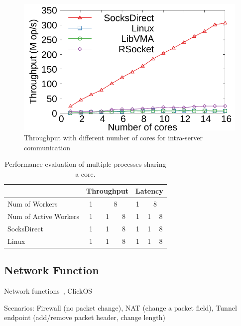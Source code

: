 \begin{figure}[htpb]
	\centering
	\includegraphics[width=\columnwidth]{eval/microbenchmark/corenum-IPC-tput.pdf}
	\caption{Throughput with different number of cores for intra-server communication}
	\label{fig:eval-cornum-ipc}
\end{figure}

\begin{table}[t]
	\centering
		\begin{tabular}{l|c|c|c|c|c|c|}
			\hline
				& \multicolumn{3}{c|}{Throughput} & \multicolumn{3}{c|}{Latency} \\
			\hline
			Num of Workers	& \multicolumn{1}{c|}{1} & \multicolumn{2}{c|}{8} & \multicolumn{1}{c|}{1} & \multicolumn{2}{c|}{8} \\
			\hline
			Num of Active Workers	& 1 & 1 & 8 & 1 & 1 & 8 \\
			\hline
			\hline
			SocksDirect 	& 1 & 1 & 8 & 1 & 1 & 8 \\
			\hline
			Linux 	& 1 & 1 & 8 & 1 & 1 & 8 \\
			\hline
		\end{tabular}
	\caption{Performance evaluation of multiple processes sharing a core.}
	\label{tab:eval-context-switch}
\end{table}



\subsection{Network Function}

Network functions~\cite{li2016clicknp}, ClickOS~\cite{martins2014clickos}

Scenarios: Firewall (no packet change), NAT (change a packet field), Tunnel endpoint (add/remove packet header, change length)

